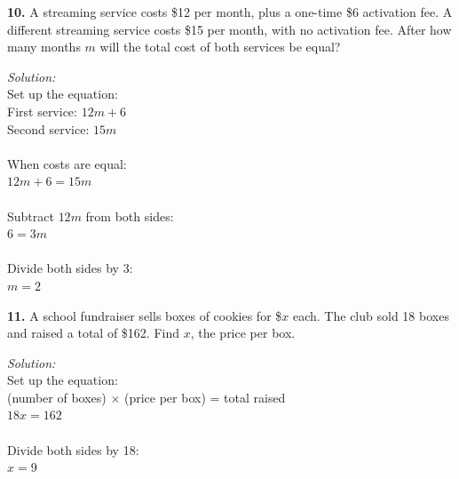 \documentclass[12pt]{article}
\begin{document}
            \textbf{10.} A streaming service costs \$12 per month, plus a one-time \$6 activation fee. A different streaming service costs \$15 per month, with no activation fee. After how many months $m$ will the total cost of both services be equal?

                \textit{Solution:}\\
                Set up the equation:\\
                First service: $12m + 6$\\
                Second service: $15m$\\
                \\
                When costs are equal:\\
                $12m + 6 = 15m$\\
                \\
                Subtract $12m$ from both sides:\\
                $6 = 3m$\\
                \\
                Divide both sides by 3:\\
                $m = 2$


                \vspace{0.5cm}

            \textbf{11.} A school fundraiser sells boxes of cookies for \$$x$ each. The club sold 18 boxes and raised a total of \$162. Find $x$, the price per box.

                \textit{Solution:}\\
                Set up the equation:\\
                (number of boxes) $\times$ (price per box) = total raised\\
                $18x = 162$\\
                \\
                Divide both sides by 18:\\
                $x = 9$

\end{document}
